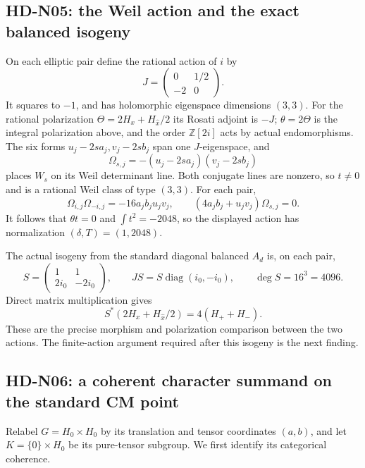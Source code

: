 \subsection{HD-N05: the Weil action and the exact balanced isogeny}
\label{hd-n05}

On each elliptic pair define the rational action of $i$ by
\[
 J=\begin{pmatrix}0&1/2\\-2&0\end{pmatrix}.
\]
It squares to $-1$, and has holomorphic eigenspace dimensions $(3,3)$.
For the rational polarization $\Theta=2H_x+H_{\widehat x}/2$ its
Rosati adjoint is $-J$; $\theta=2\Theta$ is the integral polarization
above, and the order $\mathbb Z[2i]$ acts by actual endomorphisms.
The six forms $u_j-2sa_j,v_j-2sb_j$ span one $J$-eigenspace, and
\[
 \Omega_{s,j}=-(u_j-2sa_j)(v_j-2sb_j)
\]
places $W_s$ on its Weil determinant line. Both conjugate lines are
nonzero, so $t\ne0$ and is a rational Weil class of type $(3,3)$.
For each pair,
\[
 \Omega_{i,j}\Omega_{-i,j}=-16a_jb_ju_jv_j,\qquad
 (4a_jb_j+u_jv_j)\Omega_{s,j}=0.
\]
It follows that $\theta t=0$ and $\int t^2=-2048$, so the displayed
action has normalization $(\delta,T)=(1,2048)$.

The actual isogeny from the standard diagonal balanced $A_d$ is, on
each pair,
\begin{equation}\label{hd-n-S}
 S=\begin{pmatrix}1&1\\2i_0&-2i_0\end{pmatrix},\qquad
 JS=S\operatorname{diag}(i_0,-i_0),\qquad
 \deg S=16^3=4096.
\end{equation}
Direct matrix multiplication gives
\[
 S^*(2H_x+H_{\widehat x}/2)=4(H_++H_-).
\]
These are the precise morphism and polarization comparison between the
two actions. The finite-action argument required after this isogeny is
the next finding.

\subsection{HD-N06: a coherent character summand on the standard CM point}
\label{hd-n06}

Relabel $G=H_0\times H_0$ by its translation and tensor coordinates
$(a,b)$, and let $K=\{0\}\times H_0$ be its pure-tensor subgroup.
We first identify its categorical coherence.

